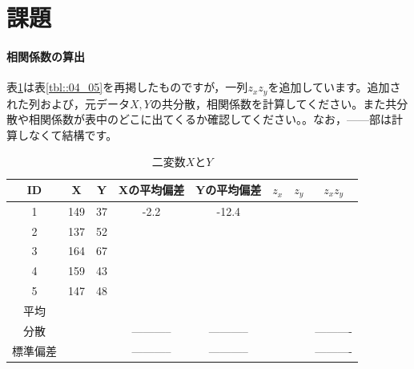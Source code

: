 \documentclass{ltjbook}
\begin{document}
\section{課題}
\paragraph{相関係数の算出}
表\ref{tbl::m04_05again}は表\ref{tbl::04_05}を再掲したものですが，一列$z_x z_y$を追加しています。追加された列および，元データ$X,Y$の共分散，相関係数を計算してください。また共分散や相関係数が表中のどこに出てくるか確認してください。。なお，------部は計算しなくて結構です。
\begin{table}[ht]
	\centering
	\caption{二変数$X$と$Y$}
	\begin{tabular}{cccccccc}
		\hline
		ID   & X   & Y  & Xの平均偏差      & Yの平均偏差      & $z_x$ & $z_y$ & $z_x z_y$  \\
		\hline
		1    & 149 & 37 & -2.2        & -12.4       &       &       &            \\
		2    & 137 & 52 &             &             &       &       &            \\
		3    & 164 & 67 &             &             &       &       &            \\
		4    & 159 & 43 &             &             &       &       &            \\
		5    & 147 & 48 &             &             &       &       &            \\
		\hline
		平均   &     &    &             &             &       &       &            \\
		分散   &     &    & ----------- & ----------- &       &       & ---------- \\
		標準偏差 &     &    & ----------- & ----------- &       &       & ---------- \\\hline
	\end{tabular}
	\label{tbl::m04_05again}
\end{table}
\end{document}
